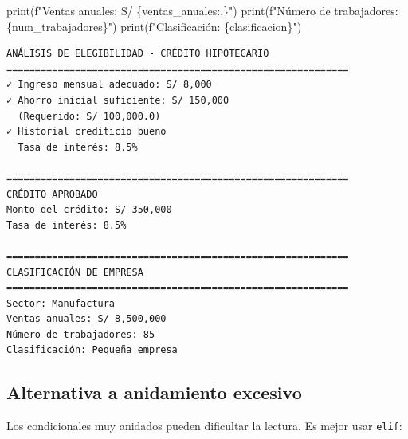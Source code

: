 \documentclass[
  doc,
  floatsintext,
  longtable,
  a4paper,
  nolmodern,
  notxfonts,
  notimes,
  12pt,
  colorlinks=true,linkcolor=blue,citecolor=blue,urlcolor=blue]{apa7}
\newenvironment{Shaded}{\begin{snugshade}}{\end{snugshade}}
\newcommand{\BuiltInTok}[1]{\textcolor[rgb]{0.00,0.23,0.31}{#1}}
\newcommand{\NormalTok}[1]{\textcolor[rgb]{0.00,0.23,0.31}{#1}}
\newcommand{\SpecialCharTok}[1]{\textcolor[rgb]{0.37,0.37,0.37}{#1}}
\newcommand{\SpecialStringTok}[1]{\textcolor[rgb]{0.13,0.47,0.30}{#1}}
\begin{document}
\begin{Shaded}
\begin{Highlighting}[]
\BuiltInTok{print}\NormalTok{(}\SpecialStringTok{f"Ventas anuales: S/ }\SpecialCharTok{\{}\NormalTok{ventas\_anuales}\SpecialCharTok{:,\}}\SpecialStringTok{"}\NormalTok{)}
\BuiltInTok{print}\NormalTok{(}\SpecialStringTok{f"Número de trabajadores: }\SpecialCharTok{\{}\NormalTok{num\_trabajadores}\SpecialCharTok{\}}\SpecialStringTok{"}\NormalTok{)}
\BuiltInTok{print}\NormalTok{(}\SpecialStringTok{f"Clasificación: }\SpecialCharTok{\{}\NormalTok{clasificacion}\SpecialCharTok{\}}\SpecialStringTok{"}\NormalTok{)}
\end{Highlighting}
\end{Shaded}

\begin{verbatim}
ANÁLISIS DE ELEGIBILIDAD - CRÉDITO HIPOTECARIO
============================================================
✓ Ingreso mensual adecuado: S/ 8,000
✓ Ahorro inicial suficiente: S/ 150,000
  (Requerido: S/ 100,000.0)
✓ Historial crediticio bueno
  Tasa de interés: 8.5%

============================================================
CRÉDITO APROBADO
Monto del crédito: S/ 350,000
Tasa de interés: 8.5%

============================================================
CLASIFICACIÓN DE EMPRESA
============================================================
Sector: Manufactura
Ventas anuales: S/ 8,500,000
Número de trabajadores: 85
Clasificación: Pequeña empresa
\end{verbatim}

\subsection{Alternativa a anidamiento
excesivo}\label{alternativa-a-anidamiento-excesivo}

Los condicionales muy anidados pueden dificultar la lectura. Es mejor
usar \texttt{elif}:
\end{document}
